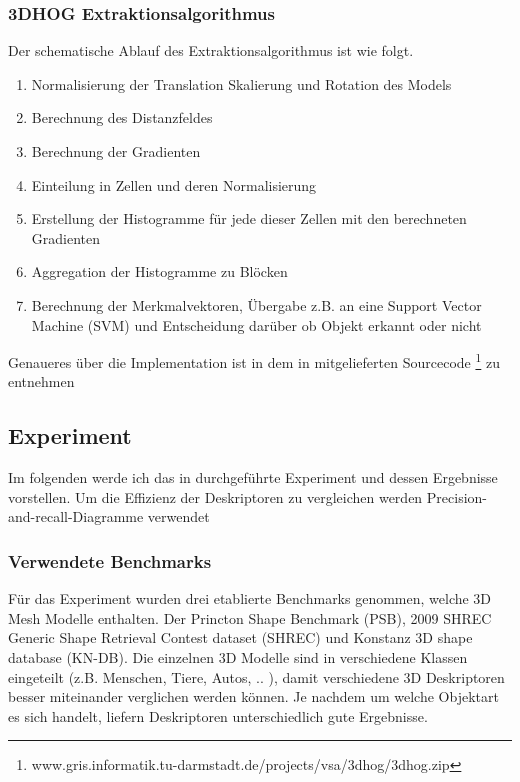\subsubsection{3DHOG Extraktionsalgorithmus }
Der schematische Ablauf des Extraktionsalgorithmus ist wie folgt.

\begin{enumerate} 
	\item Normalisierung der Translation Skalierung und Rotation des Models
	\item Berechnung des Distanzfeldes
	\item Berechnung der Gradienten
	\item Einteilung in Zellen und deren Normalisierung
	\item Erstellung der Histogramme für jede dieser Zellen mit den berechneten Gradienten
	\item Aggregation der Histogramme zu Blöcken
	\item Berechnung der Merkmalvektoren, Übergabe z.B. an eine Support Vector Machine (SVM) und Entscheidung darüber ob Objekt erkannt oder nicht
	
\end{enumerate}
Genaueres über die Implementation ist in dem in \cite{scherer2010histograms} mitgelieferten Sourcecode \footnote{www.gris.informatik.tu-darmstadt.de/projects/vsa/3dhog/3dhog.zip} zu entnehmen 

 
\subsection{Experiment}
Im folgenden werde ich das in \cite{scherer2010histograms} durchgeführte Experiment und dessen Ergebnisse vorstellen. Um die Effizienz der Deskriptoren zu vergleichen werden Precision-and-recall-Diagramme verwendet

\subsubsection{Verwendete Benchmarks}
Für das Experiment wurden drei etablierte Benchmarks genommen, welche 3D Mesh Modelle enthalten. Der Princton Shape Benchmark (PSB), 2009 SHREC Generic Shape Retrieval Contest dataset (SHREC) und Konstanz 3D shape database (KN-DB). Die einzelnen 3D Modelle sind in verschiedene Klassen eingeteilt (z.B. Menschen, Tiere, Autos, .. ), damit verschiedene 3D Deskriptoren besser miteinander verglichen werden können. Je nachdem um welche Objektart es sich handelt, liefern Deskriptoren unterschiedlich gute Ergebnisse. 


